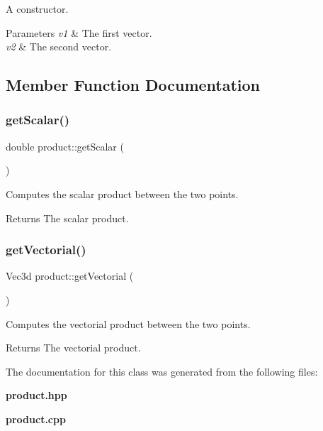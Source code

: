 A constructor. 


\begin{DoxyParams}{Parameters}
{\em v1} & The first vector. \\
\hline
{\em v2} & The second vector. \\
\hline
\end{DoxyParams}


\subsection{Member Function Documentation}
\mbox{\label{classproduct_a74c606ec2a03f632c6f86a5feac41834}} 
\subsubsection{get\+Scalar()}
{\footnotesize\ttfamily double product\+::get\+Scalar (\begin{DoxyParamCaption}{ }\end{DoxyParamCaption})}



Computes the scalar product between the two points. 

\begin{DoxyReturn}{Returns}
The scalar product. 
\end{DoxyReturn}
\mbox{\label{classproduct_a22749e150ec6baffd629cd037bbf72cd}} 
\subsubsection{get\+Vectorial()}
{\footnotesize\ttfamily Vec3d product\+::get\+Vectorial (\begin{DoxyParamCaption}{ }\end{DoxyParamCaption})}



Computes the vectorial product between the two points. 

\begin{DoxyReturn}{Returns}
The vectorial product. 
\end{DoxyReturn}


The documentation for this class was generated from the following files\+:\begin{DoxyCompactItemize}
\item 
\textbf{ product.\+hpp}\item 
\textbf{ product.\+cpp}\end{DoxyCompactItemize}
